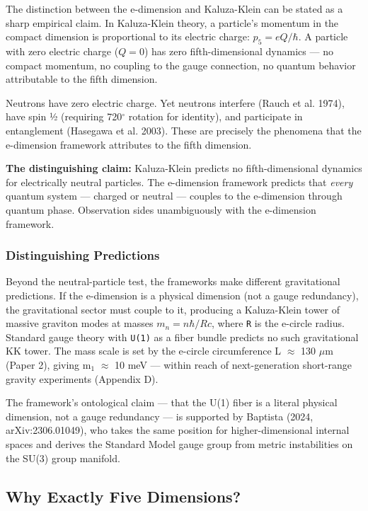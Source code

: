 \documentclass[aps,prd,preprint,superscriptaddress,longbibliography,floatfix]{revtex4-2}
\theoremstyle{remark}
\begin{document}
The distinction between the e-dimension and Kaluza-Klein can be stated as a sharp empirical claim. In Kaluza-Klein theory, a particle's momentum in the compact dimension is proportional to its electric charge: $p_{5} = eQ/\hbar$. A particle with zero electric charge ($Q = 0$) has zero fifth-dimensional dynamics --- no compact momentum, no coupling to the gauge connection, no quantum behavior attributable to the fifth dimension.

Neutrons have zero electric charge. Yet neutrons interfere (Rauch et al. 1974), have spin ½ (requiring 720$^{\circ}$ rotation for identity), and participate in entanglement (Hasegawa et al. 2003). These are precisely the phenomena that the e-dimension framework attributes to the fifth dimension.

\textbf{The distinguishing claim:} Kaluza-Klein predicts no fifth-dimensional dynamics for electrically neutral particles. The e-dimension framework predicts that \textit{every} quantum system --- charged or neutral --- couples to the e-dimension through quantum phase. Observation sides unambiguously with the e-dimension framework.


\subsubsection{Distinguishing Predictions}

Beyond the neutral-particle test, the frameworks make different gravitational predictions. If the e-dimension is a physical dimension (not a gauge redundancy), the gravitational sector must couple to it, producing a Kaluza-Klein tower of massive graviton modes at masses $m_n = n\hbar/Rc$, where \texttt{R} is the e-circle radius. Standard gauge theory with \texttt{U(1)} as a fiber bundle predicts no such gravitational KK tower. The mass scale is set by the e-circle circumference L $\approx$ 130 $\mu$m (Paper 2), giving m$_{1}$ $\approx$ 10 meV --- within reach of next-generation short-range gravity experiments (Appendix D).

The framework's ontological claim --- that the U(1) fiber is a literal physical dimension, not a gauge redundancy --- is supported by Baptista (2024, arXiv:2306.01049), who takes the same position for higher-dimensional internal spaces and derives the Standard Model gauge group from metric instabilities on the SU(3) group manifold.



\subsection{Why Exactly Five Dimensions?}
\end{document}
